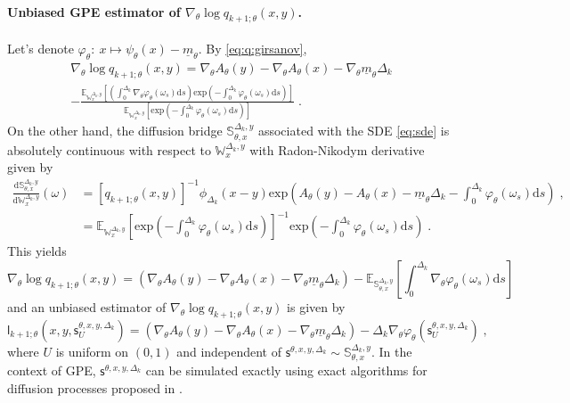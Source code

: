 \documentclass[12pt]{article}
\newcommand{\gpeLB}{\underline{m}_{\parvec}}
\newcommand{\parvec}{\theta}
\newcommand{\hd}[1]{q_{#1}}
\newcommand{\rmd}{\ensuremath{\mathrm{d}}}
\newcommand{\eqsp}{\;}
\begin{document}
\paragraph{Unbiased GPE estimator of $\nabla_{\parvec}\log\hd{k+1;\parvec}(x,y)$.}
Let's denote $\varphi_{\parvec}:~x \mapsto \psi_{\parvec}(x) - \gpeLB$. 
By \eqref{eq:q:girsanov},
\begin{multline*}
\nabla_{\parvec}\log\hd{k+1;\parvec}(x,y) = \nabla_{\parvec}A_{\parvec}(y) - \nabla_{\parvec}A_{\parvec}(x) - \nabla_{\parvec}\gpeLB \Delta_k\\
-\frac{\mathbb{E}_{\mathbb{W}_x^{\Delta_k,y}}\left[\left(\int_0^{\Delta_k} \nabla_{\parvec}\varphi_{\parvec}(\omega_s)\rmd s\right)\mathrm{exp}\left(-\int_0^{\Delta_k} \varphi_{\parvec}(\omega_s)\rmd s\right)\right]}{\mathbb{E}_{\mathbb{W}_x^{\Delta_k,y}}\left[\mathrm{exp}\left(-\int_0^{\Delta_k} \varphi_{\parvec}(\omega_s)\rmd s\right)\right]}\eqsp.
\end{multline*}
 On the other hand, the diffusion bridge $\mathbb{S}^{\Delta_k,y}_{\parvec,x}$ associated with the SDE \eqref{eq:sde} is absolutely continuous with respect to $\mathbb{W}_x^{\Delta_k,y}$ with Radon-Nikodym derivative given by
\begin{align*}
\frac{\rmd \mathbb{S}^{\Delta_k,y}_{\parvec,x}}{\rmd \mathbb{W}_x^{\Delta_k,y}}(\omega) &= \left[\hd{k+1;\parvec}(x,y)\right]^{-1}\phi_{\Delta_k}(x-y)\mathrm{exp}\left(A_{\parvec}(y) - A_{\parvec}(x) - \gpeLB\Delta_k-\int_0^{\Delta_k} \varphi_{\parvec}(\omega_s)\rmd s\right)\eqsp,\\
&=\mathbb{E}_{\mathbb{W}_x^{\Delta_k,y}}\left[\mathrm{exp}\left(-\int_0^{\Delta_k} \varphi_{\parvec}(\omega_s)\rmd s\right)\right]^{-1}\mathrm{exp}\left(-\int_0^{\Delta_k} \varphi_{\parvec}(\omega_s)\rmd s\right)\eqsp.
\end{align*}
This yields
\[
\nabla_{\parvec}\log\hd{k+1;\parvec}(x,y) = \left(\nabla_{\parvec}A_{\parvec}(y) - \nabla_{\parvec}A_{\parvec}(x) - \nabla_{\parvec}\gpeLB\Delta_k\right) - \mathbb{E}_{\mathbb{S}_{\parvec,x}^{\Delta_k,y}} \left[\int_0^{\Delta_k} \nabla_{\parvec}\varphi_{\parvec}(\omega_s)\rmd s\right]
\]
and an unbiased estimator of $\nabla_{\parvec}\log\hd{k+1;\parvec}(x,y)$ is given by
\[
\mathsf{l}_{k+1;\parvec}(x,y,\mathsf{s}^{\parvec,x,y,\Delta_k}_U) = \left(\nabla_{\parvec}A_{\parvec}(y) - \nabla_{\parvec}A_{\parvec}(x) - \nabla_{\parvec}\gpeLB\Delta_k\right) - \Delta_k\nabla_{\parvec}\varphi_{\parvec}(\mathsf{s}^{\parvec,x,y,\Delta_k}_U)\eqsp,
\]
where $U$ is uniform on $(0,1)$ and independent of $\mathsf{s}^{\parvec,x,y,\Delta_k}\sim \mathbb{S}_{\parvec,x}^{\Delta_k,y}$. In the context of GPE, $\mathsf{s}^{\parvec,x,y,\Delta_k}$ can be simulated exactly using exact algorithms for diffusion processes proposed in \cite{beskos2006retrospective}.
\end{document}
